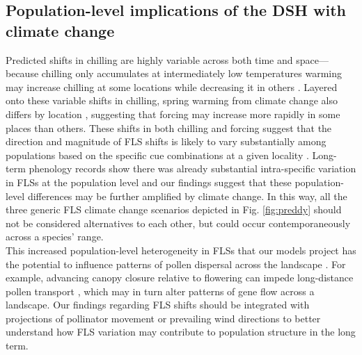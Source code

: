 \documentclass[11pt]{article}\usepackage[]{graphicx}\usepackage[]{color}
\begin{document}
\subsection*{Population-level implications of the DSH with climate change} 

\noindent%
Predicted shifts in chilling are highly variable across both time and space---because chilling only accumulates at intermediately low temperatures warming may increase chilling at some locations while decreasing it in others \citep{Man2017,Zhang:2007aa}. Layered onto these variable shifts in chilling, spring warming from climate change also differs by location \citep{Karmalkar:2017aa,Loarie:2009aa}, suggesting that forcing may increase more rapidly in some places than others. These shifts in both chilling and forcing suggest that the direction and magnitude of FLS shifts is likely to vary substantially among populations based on the specific cue combinations at a given locality \citep{Chmielewski:2012aa}. Long-term phenology records show there was already substantial intra-specific variation in FLSs at the population level \citep{Buonaiuto2020} and our findings suggest that these population-level differences may be further amplified by climate change. In this way, all the three generic FLS climate change scenarios depicted in Fig. \ref{fig:preddy} should not be considered alternatives to each other, but could occur contemporaneously across a species' range. \\ %

\noindent This increased population-level heterogeneity in FLSs that our models project has the potential to influence patterns of pollen dispersal across the landscape \citep{Borycka2017,Pace:2018aa}. For example, advancing canopy closure relative to flowering can impede long-distance pollen transport \citep{Milleron2012}, which may in turn alter patterns of gene flow across a landscape. Our findings regarding FLS shifts should be integrated with projections of pollinator movement or prevailing wind directions \citep{Kling:2020aa} to better understand how FLS variation may contribute to population structure in the long term. \\
\end{document}
